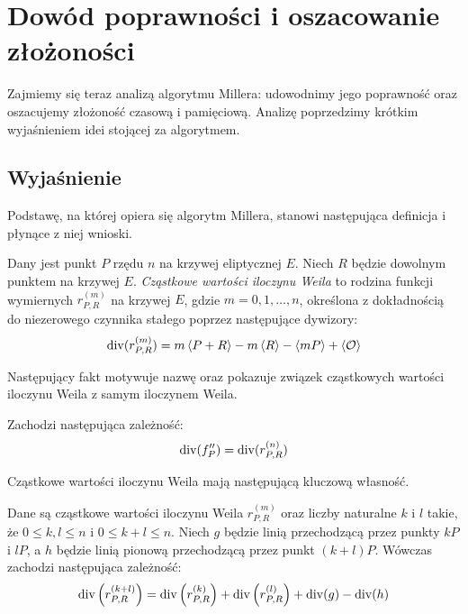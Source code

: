 \section{Dowód poprawności i oszacowanie złożoności}

\noindent
Zajmiemy się teraz analizą algorytmu Millera:
udowodnimy jego poprawność
oraz oszacujemy złożoność czasową i pamięciową.
Analizę poprzedzimy krótkim wyjaśnieniem
idei stojącej za algorytmem.

\subsection*{Wyjaśnienie}

\noindent
Podstawę, na której opiera się algorytm Millera,
stanowi następująca definicja i płynące z niej wnioski.

\begin{definition}
Dany jest punkt $P$ rzędu $n$ na krzywej eliptycznej $E$.
Niech $R$ będzie dowolnym punktem na krzywej $E$.
\emph{Cząstkowe wartości iloczynu Weila}
to rodzina funkcji wymiernych $r_{P,R}^{(m)}$ na krzywej $E$,
gdzie $m = 0, 1, \ldots, n$,
określona z dokładnością do niezerowego czynnika stałego
poprzez następujące dywizory:
\begin{equation}
\operatorname{div}(r_{P,R}^{(m)}) = m\left\langle P+R\right\rangle - m\left\langle R\right\rangle - \left\langle mP\right\rangle + \left\langle\mathcal{O}\right\rangle
\end{equation}
\end{definition}

\noindent
Następujący fakt motywuje nazwę oraz pokazuje związek
cząstkowych wartości iloczynu Weila z samym iloczynem Weila.

\begin{fact}\label{rn_eq_fp_fact}
Zachodzi następująca zależność:
\begin{equation}
\operatorname{div}(f_P'') = \operatorname{div}(r_{P,R}^{(n)})
\end{equation}
\end{fact}

\noindent
Cząstkowe wartości iloczynu Weila
mają następującą kluczową własność.

\begin{lemma}\label{dbl_add_lemma}
Dane są cząstkowe wartości iloczynu Weila $r_{P,R}^{(m)}$
oraz liczby naturalne $k$ i $l$ takie,
że $0 \leq k, l \leq n$ i $0 \leq k+l \leq n$.
Niech $g$ będzie linią przechodzącą przez punkty $kP$ i $lP$,
a $h$ będzie linią pionową przechodzącą przez punkt $(k+l)P$.
Wówczas zachodzi następująca zależność:
\begin{equation}
\operatorname{div}\left(r_{P,R}^{(k+l)}\right) =
\operatorname{div}\left(r_{P,R}^{(k)}\right) + \operatorname{div}\left(r_{P,R}^{(l)}\right) +
\operatorname{div}(g) - \operatorname{div}(h)
\end{equation}
\end{lemma}

